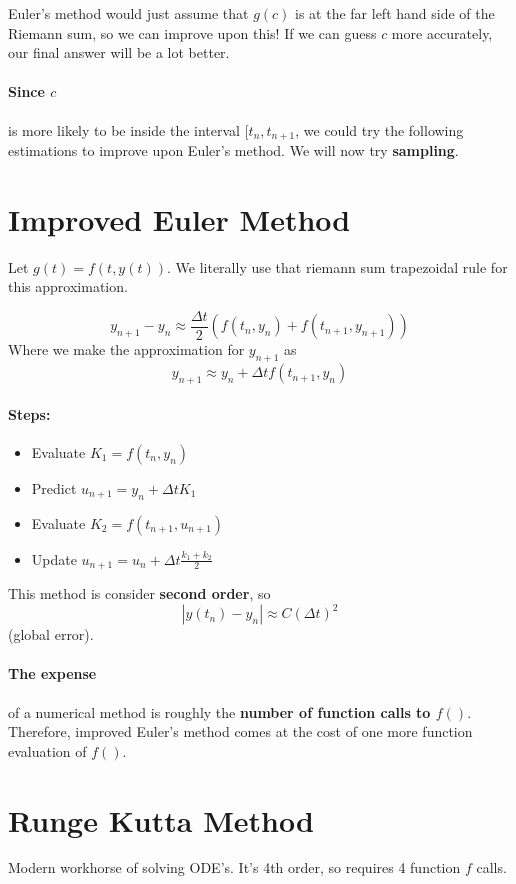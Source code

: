 \documentclass[a4paper,12pt]{report}
\begin{document}
Euler's method would just assume that $g(c)$ is at the far left hand side of the 
Riemann sum, so we can improve upon this! If we can guess $c$ more accurately, 
our final answer will be a lot better.

\paragraph{Since $c$} is more likely to be inside the interval $[t_n, t_{n+1}$, we could 
try the following estimations to improve upon Euler's method. We will now try \textbf{sampling}.

\section{Improved Euler Method}
Let $g(t) = f(t, y(t))$. We literally use that riemann sum trapezoidal rule for this approximation.

$$y_{n+1}-y_n \approx \frac{\Delta t}{2}(f(t_n, y_n)+f(t_{n+1}, y_{n+1}))$$
Where we make the approximation for $y_{n+1}$ as
$$y_{n+1} \approx y_n + \Delta t f(t_{n+1}, y_n)$$

\paragraph{Steps: }
\begin{itemize}
\item Evaluate $K_1 = f(t_n, y_n)$
\item Predict $u_{n+1} = y_n + \Delta t K_1$
\item Evaluate $K_2 = f(t_{n+1}, u_{n+1})$
\item Update $u_{n+1} = u_n + \Delta t \frac{k_1+k_2}{2}$
\end{itemize}

This method is consider \textbf{second order}, so $$|y(t_n)-y_n| \approx C(\Delta t)^2$$ (global error). 

\paragraph{The expense } of a numerical method is roughly the \textbf{number of function calls to $f()$}. 
Therefore, improved Euler's method comes at the cost of one more function evaluation of $f()$. 

\section{Runge Kutta Method}
Modern workhorse of solving ODE's. It's 4th order, so requires 4 function $f$ calls.
\end{document}

